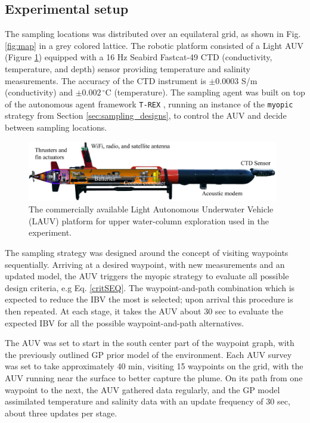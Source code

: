 \documentclass[aoas]{imsart}
\begin{document}
\subsection{Experimental setup}

The sampling locations was distributed over an equilateral grid, as shown in Fig. \ref{fig:map} in a grey colored lattice. The robotic platform consisted of a Light AUV \citep{sousa2012lauv} (Figure \ref{fig:lauv}) equipped with a 16 Hz Seabird Fastcat-49 CTD (conductivity, temperature, and depth) sensor providing temperature and salinity measurements. The accuracy of the CTD instrument is $\pm 0.0003$ S/m (conductivity) and $\pm0.002\,^{\circ}\mathrm{C}$ (temperature). The sampling agent was built on top of the autonomous agent framework \texttt{T-REX} \citep{py10,Rajan12,Rajan12b}, running an instance of the \texttt{myopic} strategy from Section \ref{sec:sampling_designs}, to control the AUV and decide between sampling locations.

\begin{figure}[!h] 
\centering 
\includegraphics[width=0.98\textwidth]{Figures/harald.jpg}
\caption{The commercially available Light Autonomous Underwater
  Vehicle (LAUV) platform for upper water-column exploration used in
  the experiment.}
\label{fig:lauv}
\end{figure} 

The sampling strategy was designed around the concept of visiting waypoints sequentially. Arriving at a desired waypoint, with new measurements and an updated model, the AUV triggers the myopic strategy to evaluate all possible design criteria, e.g Eq. \eqref{critSEQ}. The waypoint-and-path combination which is expected to reduce the IBV the most is selected; upon arrival this procedure is then repeated. At each stage, it takes the AUV about 30 sec to evaluate the expected IBV for all the possible waypoint-and-path alternatives.

The AUV was set to start in the south center part of the waypoint graph, with the previously outlined GP prior model of the environment. Each AUV survey was set to take approximately 40 min, visiting 15 waypoints on the grid, with the AUV running near the surface to better capture the plume. On its path from one waypoint to the next, the AUV gathered data regularly, and the GP model assimilated temperature and salinity data with an update frequency of 30 sec, about three updates per stage.
\end{document}
